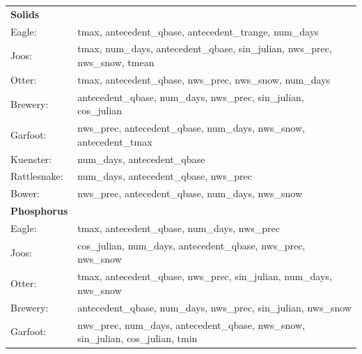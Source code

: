 \documentclass[10pt]{article}
\begin{document}
\begin{table}[h!]\small
    \begin{center}
    \begin{tabular}{ll}
        \textbf{Solids} & \\
        \hspace{5mm} Eagle: & tmax, antecedent\_qbase, antecedent\_trange, num\_days\\
        \hspace{5mm} Joos: & tmax, num\_days, antecedent\_qbase, sin\_julian, nws\_prec, nws\_snow, tmean\\
        \hspace{5mm} Otter: & tmax, antecedent\_qbase, nws\_prec, nws\_snow, num\_days\\
        \hspace{5mm} Brewery: & antecedent\_qbase, num\_days, nws\_prec, sin\_julian, cos\_julian\\
        \hspace{5mm} Garfoot: & nws\_prec, antecedent\_qbase, num\_days, nws\_snow, antecedent\_tmax\\
        \hspace{5mm} Kuenster: & num\_days, antecedent\_qbase\\
        \hspace{5mm} Rattlesnake: & num\_days, antecedent\_qbase, nws\_prec \\
        \hspace{5mm} Bower: & nws\_prec, antecedent\_qbase, num\_days, nws\_snow
    \vspace{2mm}\\
        \textbf{Phosphorus} & \\
        \hspace{5mm} Eagle: & tmax, antecedent\_qbase, num\_days, nws\_prec\\
        \hspace{5mm} Joos: & cos\_julian, num\_days, antecedent\_qbase, nws\_prec, nws\_snow\\
        \hspace{5mm} Otter: & tmax, antecedent\_qbase, nws\_prec, sin\_julian, num\_days, nws\_snow\\
        \hspace{5mm} Brewery: & antecedent\_qbase, num\_days, nws\_prec, sin\_julian, nws\_snow\\
        \hspace{5mm} Garfoot: & nws\_prec, num\_days, antecedent\_qbase, nws\_snow, sin\_julian, cos\_julian, tmin\\

\end{tabular}
\end{center}
\end{table}
\end{document}
